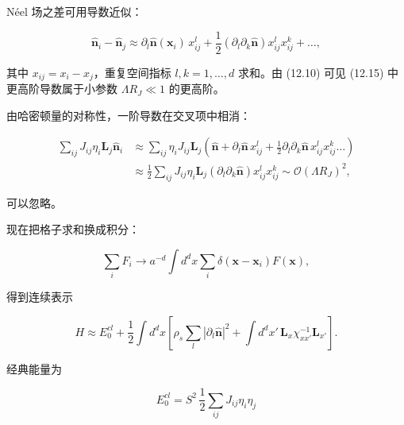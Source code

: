 Néel 场之差可用导数近似：

\begin{equation*}
\hat {\mathbf {n}} _ {i} - \hat {\mathbf {n}} _ {j} \approx \partial_ {l} \hat {\mathbf {n}} ( \mathbf {x} _ {i} ) \, x _ {ij} ^ {l} + \frac {1}{2} \left( \partial_ {l} \partial_ {k} \hat {\mathbf {n}} \right) x _ {ij} ^ {l} x _ {ij} ^ {k} + \dots ,
\tag{12.15}
\end{equation*}

其中 $x_{ij} = x_i - x_j$，重复空间指标 $l, k = 1, \ldots, d$ 求和。由 (12.10) 可见 (12.15) 中更高阶导数属于小参数 $\Lambda R_J \ll 1$ 的更高阶。

由哈密顿量的对称性，一阶导数在交叉项中相消：

\begin{align*}
\sum_ {ij} J _ {ij} \eta_ {i} \mathbf {L} _ {j} \hat {\mathbf {n}} _ {i} & \approx \sum_ {ij} \eta_ {i} J _ {ij} \mathbf {L} _ {j} \left( \hat {\mathbf {n}} + \partial_ {l} \hat {\mathbf {n}} \, x _ {ij} ^ {l} + \frac {1}{2} \partial_ {l} \partial_ {k} \hat {\mathbf {n}} \, x _ {ij} ^ {l} x _ {ij} ^ {k} \dots \right)\\
& \approx \frac {1}{2} \sum_ {ij} J _ {ij} \eta_ {i} \mathbf {L} _ {j} \left( \partial_ {l} \partial_ {k} \hat {\mathbf {n}} \right) x _ {ij} ^ {l} x _ {ij} ^ {k} \sim \mathcal {O} \left( \Lambda R _ {J} \right) ^ {2} ,
\tag{12.16}
\end{align*}

可以忽略。

现在把格子求和换成积分：

\begin{equation*}
\sum_ {i} F _ {i} \rightarrow a ^ {- d} \int d ^ {d} x \sum_ {i} \delta ( \mathbf {x} - \mathbf {x} _ {i} ) F ( \mathbf {x} ) ,
\tag{12.17}
\end{equation*}

得到连续表示

\begin{equation*}
H \approx E _ {0} ^ {cl} + \frac {1}{2} \int d ^ {d} x \left[ \rho_ {s} \sum_ {l} \left| \partial_ {l} \hat {\mathbf {n}} \right| ^ {2} + \int d ^ {d} x ' \, \mathbf {L} _ {x} \chi_{xx '} ^ {- 1} \mathbf {L} _ {x '} \right] .
\tag{12.18}
\end{equation*}

经典能量为

\begin{equation*}
E _ {0} ^ {cl} = S ^ {2} \, \frac {1}{2} \sum_ {ij} J _ {ij} \eta_ {i} \eta_ {j}
\tag{12.19}
\end{equation*}

